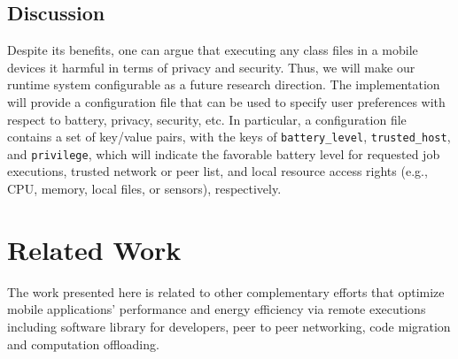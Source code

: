 \documentclass{sig-alternate}
\begin{document}
\subsection{Discussion}
Despite its benefits, one can argue that executing any class files in a mobile devices it harmful in terms of privacy and security. Thus, we will make our runtime system configurable as a future research direction. The implementation will provide a configuration file that can be used to specify user preferences with respect to battery, privacy, security, etc. In particular, a configuration file contains a set of key/value pairs, with the keys of \texttt{battery\_level}, \texttt{trusted\_host}, and \texttt{privilege}, which will indicate the favorable battery level for requested job executions, trusted network or peer list, and local resource access rights (e.g., CPU, memory, local files, or sensors), respectively.



\section{Related Work}
\label{sec:related}
The work presented here is related to other complementary efforts that optimize mobile applications' performance and energy efficiency via remote executions including software library for developers, peer to peer networking, code migration and computation offloading.
\end{document}
